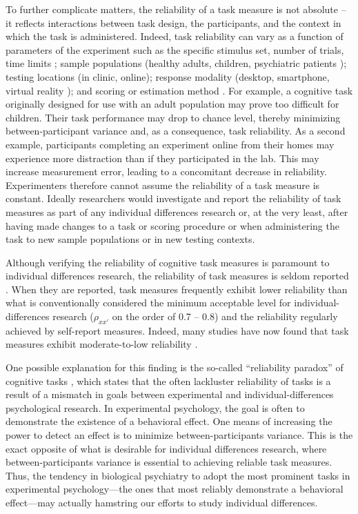 \documentclass[a4paper,12pt]{article}
\begin{document}
To further complicate matters, the reliability of a task measure is not absolute -- it reflects interactions between task design, the participants, and the context in which the task is administered. Indeed, task reliability can vary as a function of parameters of the experiment such as the specific stimulus set, number of trials, time limits \cite{paap2016role, cooper2017role}; sample populations (healthy adults, children, psychiatric patients \cite{arnon2020current, cooper2017role}); testing locations (in clinic, online); response modality (desktop, smartphone, virtual reality \cite{pronk2022can, bruder2021reliability}); and scoring or estimation method \cite{Rouder2019-am, haines2020learning}. For example, a cognitive task originally designed for use with an adult population may prove too difficult for children. Their task performance may drop to chance level, thereby minimizing between-participant variance and, as a consequence, task reliability. As a second example, participants completing an experiment online from their homes may experience more distraction than if they participated in the lab. This may increase measurement error, leading to a concomitant decrease in reliability. Experimenters therefore cannot assume the reliability of a task measure is constant. Ideally researchers would investigate and report the reliability of task measures as part of any individual differences research or, at the very least, after having made changes to a task or scoring procedure or when administering the task to new sample populations or in new testing contexts.


Although verifying the reliability of cognitive task measures is paramount to individual differences research, the reliability of task measures is seldom reported \cite{Green2016-xw, Parsons2019-jw}. When they are reported, task measures frequently exhibit lower reliability than what is conventionally considered the minimum acceptable level for individual-differences research ($\rho_{xx'}$ on the order of 0.7 -- 0.8) and the reliability regularly achieved by self-report measures. Indeed, many studies have now found that task measures exhibit moderate-to-low reliability \cite{Hedge2018-lf, Frey2017-uz, Enkavi2019-oh, Von_Bastian2020-tm, Nitsch2022-pe, verdejo2021unified}.

One possible explanation for this finding is the so-called ``reliability paradox'' of cognitive tasks \cite{Hedge2018-lf}, which states that the often lackluster reliability of tasks is a result of a mismatch in goals between experimental and individual-differences psychological research. In experimental psychology, the goal is often to demonstrate the existence of a behavioral effect. One means of increasing the power to detect an effect is to minimize between-participants variance. This is the exact opposite of what is desirable for individual differences research, where between-participants variance is essential to achieving reliable task measures. Thus, the tendency in biological psychiatry to adopt the most prominent tasks in experimental psychology---the ones that most reliably demonstrate a behavioral effect---may actually hamstring our efforts to study individual differences. 
\end{document}
